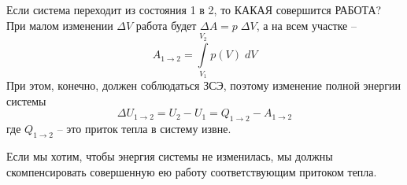  Если система переходит из состояния 1 в 2, то КАКАЯ совершится РАБОТА? При малом изменении $\Delta V$ работа будет $\Delta A=p\;\Delta V$, а на всем участке --
 \begin{displaymath}
 A_{1\rightarrow2}=\int\limits_{V_1}^{V_2}p(V)\;dV
 \end{displaymath}
 При этом, конечно, должен соблюдаться ЗСЭ, поэтому изменение полной энергии системы
 \begin{displaymath}
 \Delta U_{1\rightarrow2} = U_2-U_1=Q_{1\rightarrow2}-A_{1\rightarrow2}
 \end{displaymath}
 где $Q_{1\rightarrow2}$ -- это приток тепла в систему извне.

 Если мы хотим, чтобы энергия системы не изменилась, мы должны скомпенсировать совершенную ею работу соответствующим притоком тепла.\\

